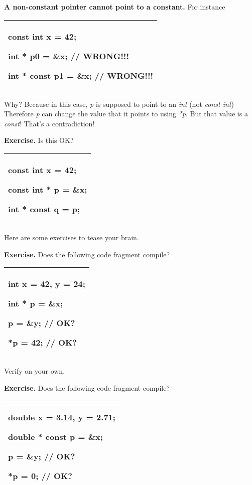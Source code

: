 \documentclass[
]{article}
\begin{document}
\textbf{A non-constant pointer cannot point to a constant.} For instance

\begin{longtable}[]{@{}l@{}}
\toprule
\endhead
\begin{minipage}[t]{0.97\columnwidth}\raggedright
const int x = 42;

int * p0 = \&x; // WRONG!!!

int * const p1 = \&x; // WRONG!!! \strut
\end{minipage}\tabularnewline
\bottomrule
\end{longtable}

Why? Because in this case, \emph{p} is supposed to point to an
\emph{int} (not \emph{const int}) Therefore \emph{p} can change the
value that it points to using \emph{*p}. But that value is a
\emph{const}! That's a contradiction!

\textbf{Exercise.} Is this OK?

\begin{longtable}[]{@{}l@{}}
\toprule
\endhead
\begin{minipage}[t]{0.97\columnwidth}\raggedright
const int x = 42;

const int * p = \&x;

int * const q = p;\strut
\end{minipage}\tabularnewline
\bottomrule
\end{longtable}

Here are some exercises to tease your brain.

\textbf{Exercise.} Does the following code fragment compile?

\begin{longtable}[]{@{}l@{}}
\toprule
\endhead
\begin{minipage}[t]{0.97\columnwidth}\raggedright
int x = 42, y = 24;

int * p = \&x;

p = \&y; // OK?

*p = 42; // OK?\strut
\end{minipage}\tabularnewline
\bottomrule
\end{longtable}

Verify on your own.

\textbf{Exercise.} Does the following code fragment compile?

\begin{longtable}[]{@{}l@{}}
\toprule
\endhead
\begin{minipage}[t]{0.97\columnwidth}\raggedright
double x = 3.14, y = 2.71;

double * const p = \&x;

p = \&y; // OK?

*p = 0; // OK?\strut
\end{minipage}\tabularnewline
\bottomrule
\end{longtable}
\end{document}
